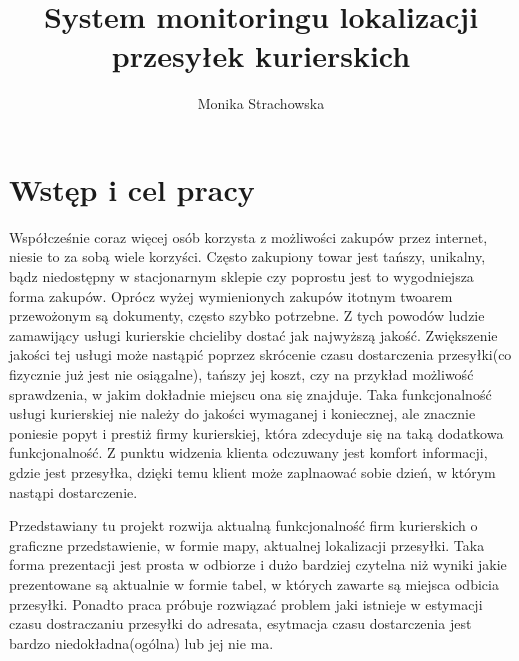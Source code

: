 \documentclass[eng,printmode,oneside]{mgr}
\title{System monitoringu lokalizacji przesyłek kurierskich}
\author{Monika Strachowska}
\begin{document}


\maketitle %


\tableofcontents %

\chapter{Wstęp i cel pracy}

Współcześnie coraz więcej osób korzysta z możliwości zakupów przez internet,
niesie to za sobą wiele korzyści. Często zakupiony towar jest tańszy, unikalny,
bądz niedostępny w stacjonarnym sklepie czy poprostu jest to wygodniejsza forma
zakupów. Oprócz wyżej wymienionych zakupów itotnym twoarem przewożonym
są dokumenty, często szybko potrzebne. Z tych powodów ludzie zamawijący usługi 
kurierskie chcieliby dostać jak najwyższą jakość. Zwiększenie jakości tej
usługi może nastąpić poprzez skrócenie czasu dostarczenia przesyłki(co
fizycznie już jest nie osiągalne), tańszy jej koszt, czy na przykład możliwość
sprawdzenia, w jakim dokładnie miejscu ona się znajduje. Taka funkcjonalność 
usługi kurierskiej nie należy do jakości wymaganej i koniecznej, ale znacznie
poniesie popyt i prestiż firmy kurierskiej, która zdecyduje się na taką
dodatkowa funkcjonalność. Z punktu widzenia klienta odczuwany jest komfort
informacji, gdzie jest przesyłka, dzięki temu klient może zaplnaować sobie
dzień, w którym nastąpi dostarczenie. 

Przedstawiany tu projekt rozwija aktualną funkcjonalność firm kurierskich o
graficzne przedstawienie, w formie mapy, aktualnej lokalizacji przesyłki. Taka
forma prezentacji jest prosta w odbiorze i dużo bardziej czytelna niż wyniki
jakie prezentowane są aktualnie w formie tabel, w których zawarte są miejsca
odbicia przesyłki. Ponadto praca próbuje rozwiązać problem jaki istnieje w
estymacji czasu dostraczaniu przesyłki do adresata, esytmacja czasu
dostarczenia jest bardzo niedokładna(ogólna) lub jej nie ma.
\end{document}
